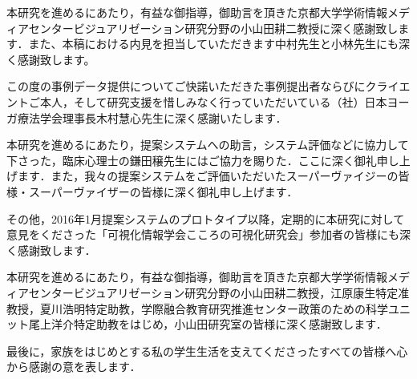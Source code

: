 \documentclass[shuuron]{kuee}
\begin{document}
\begin{acknowledgements}

本研究を進めるにあたり，有益な御指導，御助言を頂きた京都大学学術情報メディアセンタービジュアリゼーション研究分野の小山田耕二教授に深く感謝致します．また、本稿における内見を担当していただきます中村先生と小林先生にも深く感謝致します。

  この度の事例データ提供についてご快諾いただきた事例提出者ならびにクライエントご本人，そして研究支援を惜しみなく行っていただいている（社）日本ヨーガ療法学会理事長木村慧心先生に深く感謝いたします．

  本研究を進めるにあたり，提案システムへの助言，システム評価などに協力して下さった，臨床心理士の鎌田穣先生にはご協力を賜りた．ここに深く御礼申し上げます．また，我々の提案システムをご評価いただいたスーパーヴァイジーの皆様・スーパーヴァイザーの皆様に深く御礼申し上げます．

  その他，2016年1月提案システムのプロトタイプ以降，定期的に本研究に対して意見をくださった「可視化情報学会こころの可視化研究会」参加者の皆様にも深く感謝致します．

  本研究を進めるにあたり，有益な御指導，御助言を頂きた京都大学学術情報メディアセンタービジュアリゼーション研究分野の小山田耕二教授，江原康生特定准教授，夏川浩明特定助教，学際融合教育研究推進センター政策のための科学ユニット尾上洋介特定助教をはじめ，小山田研究室の皆様に深く感謝致します．




  最後に，家族をはじめとする私の学生生活を支えてくださったすべての皆様へ心から感謝の意を表します．
\end{acknowledgements}








\appendix
\end{document}

